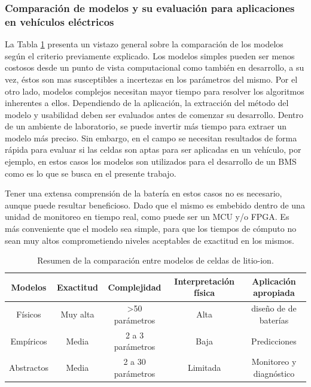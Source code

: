\documentclass[10pt,a4paper]{article}
\begin{document}
\subsubsection{Comparaci\'on de modelos y su evaluaci\'on para aplicaciones
en veh\'iculos el\'ectricos}\label{compModels}

\noindent La Tabla \ref{table_comp_models} presenta un vistazo general sobre la
comparaci\'on de los modelos seg\'un el criterio previamente explicado. Los
modelos simples pueden ser menos costosos desde un punto de vista computacional
como tambi\'en en desarrollo, a su vez, \'estos son mas susceptibles a
incertezas en los par\'ametros del mismo. Por el otro lado, modelos complejos
necesitan mayor tiempo para resolver los algoritmos inherentes a ellos.
Dependiendo de la aplicaci\'on, la extracci\'on del m\'etodo del modelo y
usabilidad deben ser evaluados antes de comenzar su desarrollo. 
Dentro de un ambiente de laboratorio, se puede invertir m\'as tiempo para 
extraer un modelo m\'as preciso. Sin embargo, en el campo se necesitan 
resultados de forma r\'apida para evaluar si las celdas son aptas para ser 
aplicadas en un veh\'iculo, por ejemplo, en estos casos los modelos son 
utilizados para el desarrollo de un \acrshort{BMS} como es lo que se busca en el 
presente trabajo. 

\noindent Tener una extensa comprensi\'on de la bater\'ia en estos casos no es
necesario, aunque puede resultar beneficioso. Dado que el mismo es embebido
dentro de una unidad de monitoreo en tiempo real, como puede ser un 
\acrshort{MCU} y/o \acrshort{FPGA}. Es m\'as conveniente que el modelo sea 
simple, para que los tiempos de c\'omputo no sean muy altos comprometiendo 
niveles aceptables de exactitud en los mismos. 

\begin{table}[h!]
\begin{center}
\begin{tabular}{@{}ccccc@{}}
\textbf{Modelos} & \textbf{Exactitud} & \textbf{Complejidad} &
\textbf{Interpretaci\'on f\'isica} & \textbf{Aplicaci\'on apropiada}\\
\hline
F\'isicos   & Muy alta  & \textgreater{}50 par\'ametros         & Alta
& diseño de de bater\'ias \\\hline Emp\'iricos & Media 
& 2 a 3 par\'ametros & Baja & Predicciones\\ 
\hline Abstractos & Media & 2 a 30 par\'ametros & Limitada & 
Monitoreo y diagn\'ostico
\end{tabular}
\caption{Resumen de la comparaci\'on entre modelos de celdas de litio-ion.}
\label{table_comp_models}
\end{center}
\end{table}
\end{document}
